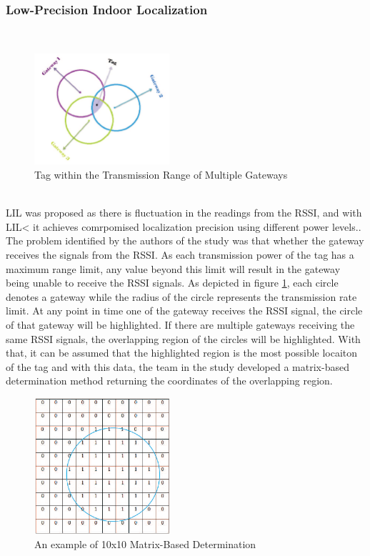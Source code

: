 \documentclass{l4proj}
\begin{document}
\subsubsection{Low-Precision Indoor Localization}~\\
\begin{figure}[h]
    \centering
    \includegraphics[width=50mm]{images/lil}
    \caption{Tag within the Transmission Range of Multiple Gateways}
    \label{fig:lil1}
\end{figure}\\
LIL was proposed as there is fluctuation in the readings from the RSSI, and with LIL< it achieves comrpomised localization precision using different power levels.\cite{lil}. The problem identified by the authors of the study was that whether the gateway receives the signals from the RSSI. As each transmission power of the tag has a maximum range limit, any value beyond this limit will result in the gateway being unable to receive the RSSI signals. As depicted in figure \ref{fig:lil1}, each circle denotes a gateway while the radius of the circle represents the transmission rate limit. At any point in time one of the gateway receives the RSSI signal, the circle of that gateway will be highlighted. If there are multiple gateways receiving the same RSSI signals, the overlapping region of the circles will be highlighted. With that, it can be assumed that the highlighted region is the most possible locaiton of the tag and with this data, the team in the study developed a matrix-based determination method returning the coordinates of the overlapping region.\cite{matrix}\\
\begin{figure}[h]
    \centering
    \includegraphics[width=50mm]{images/matrix}
    \caption{An example of 10x10 Matrix-Based Determination}
    \label{fig:matrix1}
\end{figure}\\
\end{document}
